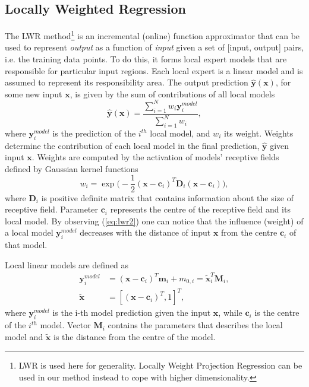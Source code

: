 \subsection{Locally Weighted Regression}
The LWR method\footnote{LWR is used here for generality. Locally Weight Projection Regression\cite{Vijayakumar2005} can be used in our method instead to cope with higher dimensionality.} is an incremental (online) function approximator that can be used to represent {\it output} as a function of {\it input} given a set of [input, output] pairs, i.e. the training data points. To do this, it forms local expert models that are responsible for particular input regions. Each local expert is a linear model and is assumed to represent its responsibility area. The output prediction $\hat{\bm{y}}(\bm{x})$, for some new input $\bm{x}$, is given by the sum of contributions of all local models \cite{Schaal1998}
\begin{equation}
\hat{\bm{y}}(\bm{x}) = \frac{\sum\limits_{i=1}^N w_{i}\bm{y}_{i}^{model}}{\sum\limits_{i=1}^N w_{i}},
\label{eq:lwr1}
\end{equation}
where $\bm{y}_{i}^{model}$ is the prediction of the $i^{th}$ local model, and $w_{i}$ its weight. Weights determine the contribution of each local model in the final prediction, $\hat{\bm{y}}$ given input $\bm{x}$. Weights are computed by the activation of models' receptive fields defined by Gaussian kernel functions \cite{Schaal1998}
\begin{equation}
w_{i} = \exp\big(-\frac{1}{2}(\bm{x}-\bm{c}_{i})^{T}\bm{D}_{i}(\bm{x}-\bm{c}_{i})\big),
\label{eq:lwr2}
\end{equation}
where $\bm{D}_{i}$ is positive definite matrix that contains information about the size of receptive field. Parameter $\bm{c}_{i}$ represents the centre of the receptive field and its local model. By observing (\ref{eq:lwr2}) one can notice that the influence (weight) of a local model $\bm{y}_{i}^{model}$ decreases with the distance of input $\bm{x}$ from the centre $\bm{c}_{i}$ of that model.

Local linear models are defined as \cite{Schaal1998}
\begin{align}
	\bm{y}_{i}^{model} &= (\bm{x} - \bm{c}_i)^{T} \bm{m}_i + m_{0,i} = \tilde{\bm{x}}_{i}^{T}\bm{M}_{i},\label{eq:lwr3}\\
	\tilde{\bm{x}} &= [(\bm{x}-\bm{c}_{i})^{T},1]^{T},\label{eq:lwr4}
\end{align}
where $\bm{y}_{i}^{model}$ is the i-th model prediction given the input $\bm{x}$, while $\bm{c}_{i}$ is the centre of the $i^{th}$ model. Vector $\bm{M}_{i}$ contains the parameters that describes the local model and $\tilde{\bm{x}}$ is the distance from the centre of the model.

